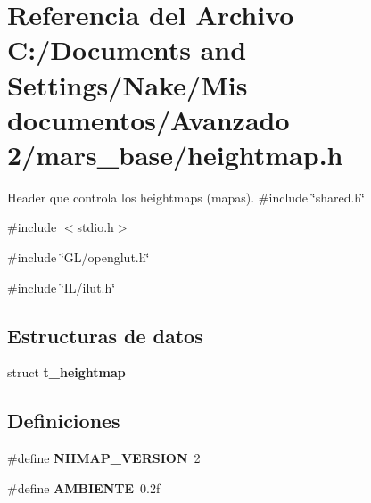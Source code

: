 \section{Referencia del Archivo C:/Documents and Settings/Nake/Mis documentos/Avanzado 2/mars\_\-base/heightmap.h}
\label{heightmap_8h}


Header que controla los heightmaps (mapas).  
{\ttfamily \#include \char`\"{}shared.h\char`\"{}}\par
{\ttfamily \#include $<$stdio.h$>$}\par
{\ttfamily \#include \char`\"{}GL/openglut.h\char`\"{}}\par
{\ttfamily \#include \char`\"{}IL/ilut.h\char`\"{}}\par
\subsection*{Estructuras de datos}
\begin{DoxyCompactItemize}
\item 
struct {\bf t\_\-heightmap}
\end{DoxyCompactItemize}
\subsection*{Definiciones}
\begin{DoxyCompactItemize}
\item 
\#define {\bfseries NHMAP\_\-VERSION}~2\label{heightmap_8h_a75d3f3db472596f0c6a0d790e007ba38}

\item 
\#define {\bfseries AMBIENTE}~0.2f\label{heightmap_8h_a214e26f6ef3547099209ae11dbbffeb0}

\end{DoxyCompactItemize}
